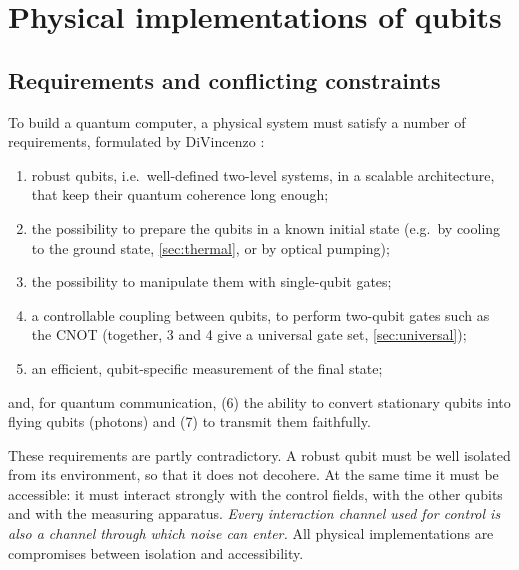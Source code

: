 \chapter{Physical implementations of qubits}\label{ch:implementations}

\section{Requirements and conflicting constraints}
To build a quantum computer, a physical system must satisfy a number of requirements, formulated by DiVincenzo \cite{DiVincenzo2000}:
\begin{enumerate}
  \item robust qubits, i.e.\ well-defined two-level systems, in a scalable architecture, that keep their quantum coherence long enough;
  \item the possibility to prepare the qubits in a known initial state (e.g.\ by cooling to the ground state, \cref{sec:thermal}, or by optical pumping);
  \item the possibility to manipulate them with single-qubit gates;
  \item a controllable coupling between qubits, to perform two-qubit gates such as the CNOT (together, 3 and 4 give a universal gate set, \cref{sec:universal});
  \item an efficient, qubit-specific measurement of the final state;
\end{enumerate}
and, for quantum communication, (6) the ability to convert stationary qubits into flying qubits (photons) and (7) to transmit them faithfully.

These requirements are partly contradictory. A robust qubit must be well isolated from its environment, so that it does not decohere. At the same time it must be accessible: it must interact strongly with the control fields, with the
other qubits and with the measuring apparatus. \emph{Every interaction channel used for control is also a channel through which noise can enter.} All physical implementations are compromises between isolation and accessibility.

